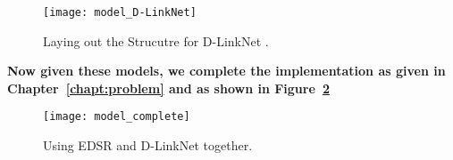 \begin{figure}[t]
  \centering
  \texttt{[image: model\_D-LinkNet]}
  \caption{Laying out the Strucutre for D-LinkNet \cite{D-LinkNet}.}
  \label{fig:model_D-LinkNet}
\end{figure}


\textbf{Now given these models, we complete the implementation as given in Chapter~\ref{chapt:problem} and as shown in Figure~\ref{fig:model_complete}}

\begin{figure}[h!]
  \centering
  \texttt{[image: model\_complete]}
  \caption{Using EDSR and D-LinkNet together.}
  \label{fig:model_complete}
\end{figure}



